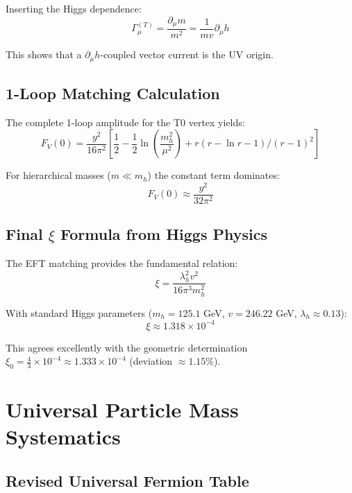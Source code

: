 \documentclass[12pt,a4paper]{article}
\begin{document}
	Inserting the Higgs dependence:
	\begin{equation}
		\Gamma_\mu^{(T)} = \frac{\partial_\mu m}{m^2} = \frac{1}{mv}\partial_\mu h
	\end{equation}
	
	This shows that a $\partial_\mu h$-coupled vector current is the UV origin.
	
	\subsection{1-Loop Matching Calculation}
	\label{subsec:one_loop_matching}
	
	The complete 1-loop amplitude for the T0 vertex yields:
	\begin{equation}
		F_V(0) = \frac{y^2}{16\pi^2}\left[\frac{1}{2} - \frac{1}{2}\ln\left(\frac{m_h^2}{\mu^2}\right) + r(r-\ln r-1)/(r-1)^2\right]
	\end{equation}
	
	For hierarchical masses ($m \ll m_h$) the constant term dominates:
	\begin{equation}
		F_V(0) \approx \frac{y^2}{32\pi^2}
	\end{equation}
	
	\subsection{Final $\xi$ Formula from Higgs Physics}
	\label{subsec:final_xi_formula}
	
	The EFT matching provides the fundamental relation:
	\begin{equation}
		\boxed{\xi = \frac{\lambda_h^2 v^2}{16\pi^3 m_h^2}}
	\end{equation}
	
	With standard Higgs parameters ($m_h = 125.1$ GeV, $v = 246.22$ GeV, $\lambda_h \approx 0.13$):
	\begin{equation}
		\xi \approx 1.318 \times 10^{-4}
	\end{equation}
	
	This agrees excellently with the geometric determination $\xi_0 = \frac{4}{3} \times 10^{-4} \approx 1.333 \times 10^{-4}$ (deviation $\approx 1.15\%$).
	
	\section{Universal Particle Mass Systematics}
	\label{sec:universal_masses}
	
	\subsection{Revised Universal Fermion Table}
	\label{subsec:universal_table}
	
\end{document}
